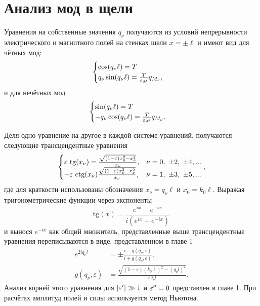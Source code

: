 \newpage
\appendix
\chapter{Анализ мод в щели}
Уравнения на собственные значения $q_\nu$ получаются из условий непрерывности электрического и магнитного полей на стенках щели $x = \pm \ell$ и имеют вид для чётных мод:
\begin{equation}
    \begin{cases}
        \cos(q_\nu \ell) = T \\
        q_\nu \sin (q_\nu \ell)  = \frac{T}{\varepsilon_M} q_{M_\nu},
    \end{cases}
    \label{eq:roots_even_ap}
\end{equation}
и для нечётных мод
\begin{equation}
    \begin{cases}
        \sin(q_\nu \ell) = T \\
        -q_\nu \cos (q_\nu \ell)  = \frac{T}{\varepsilon_M} q_{M_\nu}. 
    \end{cases}
    \label{eq:roots_odd_ap}
\end{equation}

Деля одно уравнение на другое в каждой системе уравнений, получаются следующие трансцендентные уравнения
\begin{equation}
    \begin{cases}
        \varepsilon\ \text{tg}(x_\nu) = \frac{\sqrt{(1-\varepsilon)x_0^2  - x_\nu^2}}{x_\nu}, & \nu = 0,\ \pm 2,\ \pm 4, ... \\
        -\varepsilon\ \text{ctg}(x_\nu) \frac{\sqrt{(1-\varepsilon)x_0^2 - x_\nu^2}}{x_\nu}, & \nu = 1,\ \pm 3,\ \pm 5, ... \\
    \end{cases},
\end{equation}
где для краткости использованы обозначения $x_\nu = q_\nu \ell$ и $x_0 = k_0 \ell$. Выражая тригонометрические функции через экспоненты
\begin{equation*}
     \text{tg}(x) = \frac{e^{i x} - e^{-i x}}{i (e^{i x} + e^{-i x})}
\end{equation*}
и вынося $e^{-ix}$ как общий множитель, представленные выше трансцендентные уравнения переписываются в виде, представленном в главе 1
\begin{align}
e^{2i q_\nu l} &= \pm \frac{i-g(q_\nu,\varepsilon)}{i+g(q_\nu,\varepsilon)},\label{eq:BoundCond_ap} \\
g(q_\nu,\varepsilon) & = \frac{\sqrt{(1-\varepsilon)(k_0 \ell)^2 - (q_\nu l)^2}}{\varepsilon q_\nu l}.  \nonumber
\end{align}
Анализ корней этого уравнения для $\lvert\varepsilon'\rvert\gg 1$ и $\varepsilon'' = 0$ представлен в главе 1. При расчётах амплитуд полей и силы используется метод Ньютона. 

